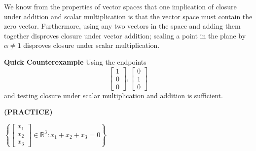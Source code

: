 \begin{enumerate}
{	We know from the properties of vector spaces that one implication of closure under addition and scalar multiplication is that the vector space must contain the zero vector. Furthermore, using any two vectors in the space and adding them together disproves closure under vector addition; scaling a point in the plane by $\alpha \neq 1$ disproves closure under scalar multiplication.

	\textbf{Quick Counterexample}
	Using the endpoints $$\begin{bmatrix}1\\0\\0\end{bmatrix}, \begin{bmatrix}0\\1\\0\end{bmatrix}$$ and testing closure under scalar multiplication and addition is sufficient.
}

\qitem\label{ques:notAffine}{
	\textbf{(PRACTICE)}
	
	$\left\{\begin{bmatrix}x_1\\x_2\\x_3\end{bmatrix} \in \mathbb{R}^3 : x_1 + x_2 + x_3 = 0\right\}$
}


\end{enumerate}
